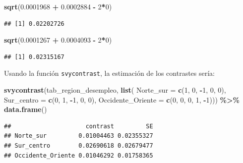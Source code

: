 \documentclass[
  12pt,
]{book}
\newenvironment{Shaded}{\begin{snugshade}}{\end{snugshade}}
\newcommand{\AttributeTok}[1]{\textcolor[rgb]{0.13,0.29,0.53}{#1}}
\newcommand{\DecValTok}[1]{\textcolor[rgb]{0.00,0.00,0.81}{#1}}
\newcommand{\FloatTok}[1]{\textcolor[rgb]{0.00,0.00,0.81}{#1}}
\newcommand{\FunctionTok}[1]{\textcolor[rgb]{0.13,0.29,0.53}{\textbf{#1}}}
\newcommand{\NormalTok}[1]{#1}
\newcommand{\SpecialCharTok}[1]{\textcolor[rgb]{0.81,0.36,0.00}{\textbf{#1}}}
\begin{document}
\begin{Shaded}
\begin{Highlighting}[]
\FunctionTok{sqrt}\NormalTok{(}\FloatTok{0.0001968} \SpecialCharTok{+} \FloatTok{0.0002884} \SpecialCharTok{{-}} \DecValTok{2}\SpecialCharTok{*}\DecValTok{0}\NormalTok{)}
\end{Highlighting}
\end{Shaded}

\begin{verbatim}
## [1] 0.02202726
\end{verbatim}

\begin{Shaded}
\begin{Highlighting}[]
\FunctionTok{sqrt}\NormalTok{(}\FloatTok{0.0001267} \SpecialCharTok{+} \FloatTok{0.0004093} \SpecialCharTok{{-}} \DecValTok{2}\SpecialCharTok{*}\DecValTok{0}\NormalTok{)}
\end{Highlighting}
\end{Shaded}

\begin{verbatim}
## [1] 0.02315167
\end{verbatim}

Usando la función \texttt{svycontrast}, la estimación de los contrastes sería:

\begin{Shaded}
\begin{Highlighting}[]
\FunctionTok{svycontrast}\NormalTok{(tab\_region\_desempleo, }\FunctionTok{list}\NormalTok{(}
                             \AttributeTok{Norte\_sur =} \FunctionTok{c}\NormalTok{(}\DecValTok{1}\NormalTok{, }\DecValTok{0}\NormalTok{, }\SpecialCharTok{{-}}\DecValTok{1}\NormalTok{, }\DecValTok{0}\NormalTok{, }\DecValTok{0}\NormalTok{),}
                             \AttributeTok{Sur\_centro =} \FunctionTok{c}\NormalTok{(}\DecValTok{0}\NormalTok{, }\DecValTok{1}\NormalTok{, }\SpecialCharTok{{-}}\DecValTok{1}\NormalTok{, }\DecValTok{0}\NormalTok{, }\DecValTok{0}\NormalTok{),}
                             \AttributeTok{Occidente\_Oriente =} \FunctionTok{c}\NormalTok{(}\DecValTok{0}\NormalTok{, }\DecValTok{0}\NormalTok{, }\DecValTok{0}\NormalTok{, }\DecValTok{1}\NormalTok{, }\SpecialCharTok{{-}}\DecValTok{1}\NormalTok{))) }\SpecialCharTok{\%\textgreater{}\%} \FunctionTok{data.frame}\NormalTok{()}
\end{Highlighting}
\end{Shaded}

\begin{verbatim}
##                     contrast         SE
## Norte_sur         0.01004463 0.02355327
## Sur_centro        0.02690618 0.02679477
## Occidente_Oriente 0.01046292 0.01758365
\end{verbatim}
\end{document}
